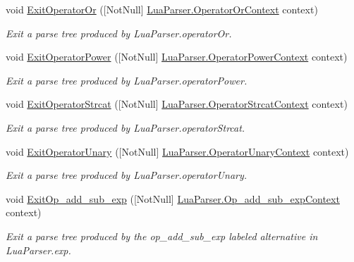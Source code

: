 \begin{DoxyCompactItemize}
void \mbox{\hyperlink{classzlua_1_1_compiler_a51d355ddfa730787d5353559db7acbce}{Exit\+Operator\+Or}} (\mbox{[}Not\+Null\mbox{]} \mbox{\hyperlink{classzlua_1_1_lua_parser_1_1_operator_or_context}{Lua\+Parser.\+Operator\+Or\+Context}} context)
\begin{DoxyCompactList}\small\item\em Exit a parse tree produced by Lua\+Parser.\+operator\+Or. \end{DoxyCompactList}\item 
void \mbox{\hyperlink{classzlua_1_1_compiler_a5c623270aa4a3005cf103f95ff8566a7}{Exit\+Operator\+Power}} (\mbox{[}Not\+Null\mbox{]} \mbox{\hyperlink{classzlua_1_1_lua_parser_1_1_operator_power_context}{Lua\+Parser.\+Operator\+Power\+Context}} context)
\begin{DoxyCompactList}\small\item\em Exit a parse tree produced by Lua\+Parser.\+operator\+Power. \end{DoxyCompactList}\item 
void \mbox{\hyperlink{classzlua_1_1_compiler_a320c32704688e1ba4705eb347b0e5701}{Exit\+Operator\+Strcat}} (\mbox{[}Not\+Null\mbox{]} \mbox{\hyperlink{classzlua_1_1_lua_parser_1_1_operator_strcat_context}{Lua\+Parser.\+Operator\+Strcat\+Context}} context)
\begin{DoxyCompactList}\small\item\em Exit a parse tree produced by Lua\+Parser.\+operator\+Strcat. \end{DoxyCompactList}\item 
void \mbox{\hyperlink{classzlua_1_1_compiler_a345eb068591d3ef3beddc652b206e53f}{Exit\+Operator\+Unary}} (\mbox{[}Not\+Null\mbox{]} \mbox{\hyperlink{classzlua_1_1_lua_parser_1_1_operator_unary_context}{Lua\+Parser.\+Operator\+Unary\+Context}} context)
\begin{DoxyCompactList}\small\item\em Exit a parse tree produced by Lua\+Parser.\+operator\+Unary. \end{DoxyCompactList}\item 
void \mbox{\hyperlink{classzlua_1_1_compiler_affc819ef0753a9871122ffe4144bffe2}{Exit\+Op\+\_\+add\+\_\+sub\+\_\+exp}} (\mbox{[}Not\+Null\mbox{]} \mbox{\hyperlink{classzlua_1_1_lua_parser_1_1_op__add__sub__exp_context}{Lua\+Parser.\+Op\+\_\+add\+\_\+sub\+\_\+exp\+Context}} context)
\begin{DoxyCompactList}\small\item\em Exit a parse tree produced by the {\ttfamily op\+\_\+add\+\_\+sub\+\_\+exp} labeled alternative in Lua\+Parser.\+exp. \end{DoxyCompactList}\item 

\end{DoxyCompactItemize}
